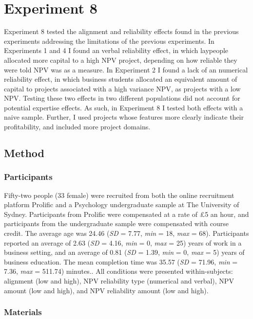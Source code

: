 \documentclass[a4paper, nobind, dvipsnames]{templates/ociamthesis}
\theoremstyle{definition}
\theoremstyle{definition}
\theoremstyle{definition}
\theoremstyle{definition}
\theoremstyle{remark}
\begin{document}
\hypertarget{alignment-7}{%
\section{Experiment 8}\label{alignment-7}}

Experiment 8 tested the alignment and reliability effects found in the previous
experiments addressing the limitations of the previous experiments. In
Experiments 1 and 4 I found an verbal reliability effect, in which laypeople
allocated more capital to a high NPV project, depending on how reliable they
were told NPV was as a measure. In Experiment 2 I found a lack of an numerical
reliability effect, in which business students allocated an equivalent amount of
capital to projects associated with a high variance NPV, as projects with a
low NPV. Testing these two effects in two different populations did not account
for potential expertise effects. As such, in Experiment 8 I tested both effects
with a naive sample. Further, I used projects whose features more clearly
indicate their profitability, and included more project domains.

\subsection{Method}

\subsubsection{Participants}

Fifty-two people (33 female) were recruited from both the online recruitment platform Prolific and a Psychology undergraduate sample at The University of Sydney. Participants from Prolific were compensated at a rate of £5 an hour, and participants from the undergraduate sample were compensated with course credit. The average age was 24.46 (\emph{SD} = 7.77, \emph{min} = 18, \emph{max} = 68). Participants reported an average of 2.63 (\emph{SD} = 4.16, \emph{min} = 0, \emph{max} = 25) years of work in a business setting, and an average of 0.81 (\emph{SD} = 1.39, \emph{min} = 0, \emph{max} = 5) years of business education. The mean completion time was 35.57 (\emph{SD} = 71.96, \emph{min} = 7.36, \emph{max} = 511.74) minutes.. All conditions were presented within-subjects:
alignment (low and high), NPV reliability type (numerical and verbal), NPV
amount (low and high), and NPV reliability amount (low and high).

\subsubsection{Materials}
\end{document}
